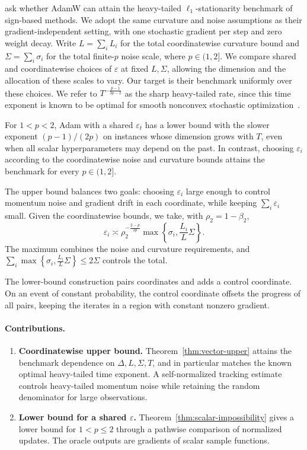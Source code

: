 \documentclass[11pt,letterpaper]{article}
\theoremstyle{definition}
\newcommand{\eps}{\varepsilon}
\begin{document}
\citet[Eq.~(2)]{yu2026openproblem} ask whether AdamW can attain the heavy-tailed $\ell_1$-stationarity benchmark of sign-based methods. We adopt the same curvature and noise assumptions as their gradient-independent setting, with one stochastic gradient per step and zero weight decay. Write $L=\sum_iL_i$ for the total coordinatewise curvature bound and $\Sigma=\sum_i\sigma_i$ for the total finite-$p$ noise scale, where $p\in(1,2]$. We compare shared and coordinatewise choices of $\eps$ at fixed $L,\Sigma$, allowing the dimension and the allocation of these scales to vary. Our target is their benchmark uniformly over these choices. We refer to $T^{-\frac{p-1}{3p-2}}$ as the sharp heavy-tailed rate, since this time exponent is known to be optimal for smooth nonconvex stochastic optimization~\citep{liu2025heavy}.

For $1<p<2$, Adam with a shared $\eps_t$ has a lower bound with the slower exponent $(p-1)/(2p)$ on instances whose dimension grows with $T$, even when all scalar hyperparameters may depend on the past. In contrast, choosing $\eps_i$ according to the coordinatewise noise and curvature bounds attains the benchmark for every $p\in(1,2]$.

The upper bound balances two goals: choosing $\eps_i$ large enough to control momentum noise and gradient drift in each coordinate, while keeping $\sum_i\eps_i$ small. Given the coordinatewise bounds, we take, with $\rho_2=1-\beta_2$,
\begin{equation}
\eps_i
\asymp
\rho_2^{-\frac{2-p}{2p}}
\max\left\{\sigma_i,\frac{L_i}{L}\Sigma\right\}.
\label{eq:coordinate-floor-intro}
\end{equation}
The maximum combines the noise and curvature requirements, and
$\sum_i\max\left\{\sigma_i,\frac{L_i}{L}\Sigma\right\}\le2\Sigma$ controls the total.

The lower-bound construction pairs coordinates and adds a control coordinate. On an event of constant probability, the control coordinate offsets the progress of all pairs, keeping the iterates in a region with constant nonzero gradient.

\paragraph{Contributions.}
\begin{enumerate}
\item \textbf{Coordinatewise upper bound.} Theorem~\ref{thm:vector-upper} attains the benchmark dependence on $\Delta,L,\Sigma,T$, and in particular matches the known optimal heavy-tailed time exponent. A self-normalized tracking estimate controls heavy-tailed momentum noise while retaining the random denominator for large observations.
\item \textbf{Lower bound for a shared $\eps$.} Theorem~\ref{thm:scalar-impossibility} gives a lower bound for $1<p\le2$ through a pathwise comparison of normalized updates. The oracle outputs are gradients of scalar sample functions.

\end{enumerate}
\end{document}
